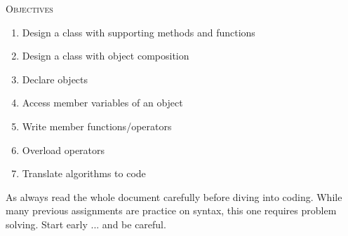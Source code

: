 
\textsc{Objectives}     
\begin{enumerate}[nosep]
        \item Design a class with supporting methods and functions
        \item Design a class with object composition
        \item Declare objects
        \item Access member variables of an object
        \item Write member functions/operators
        \item Overload operators
        \item Translate algorithms to code
    \end{enumerate}

As always read the whole document carefully before diving into coding.
While many previous assignments are practice on syntax, this one
requires problem solving.
Start early ... and be careful.
